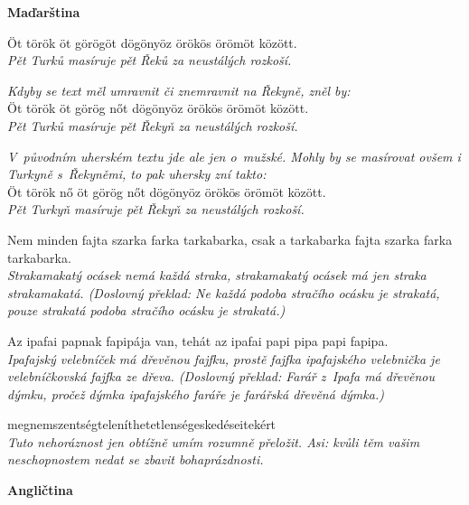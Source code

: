 \bigskip
\noindent
\textbf{Maďarština}

\medskip

\noindent
Öt török öt görögöt dögönyöz örökös örömöt között. \\
\textit{Pět Turků masíruje pět Řeků za neustálých rozkoší.}

\medskip

\noindent
\textit{Kdyby se text měl umravnit či znemravnit na Řekyně, zněl by: }\\
Öt török öt görög nőt dögönyöz örökös örömöt között. \\
\textit{Pět Turků masíruje pět Řekyň za neustálých rozkoší.}

\medskip

\noindent
\textit{V původním uherském textu jde ale jen o~mužské. Mohly by se masírovat ovšem i Turkyně s Řekyněmi, to pak uhersky zní takto:} \\
Öt török nő öt görög nőt dögönyöz örökös örömöt között.  \\
\textit{Pět Turkyň masíruje pět Řekyň za neustálých rozkoší.}

\medskip

\noindent
Nem minden fajta szarka farka tarkabarka, csak a tarkabarka fajta szarka farka tarkabarka. \\
\textit{Strakamakatý ocásek nemá každá straka, strakamakatý ocásek má jen straka strakamakatá. (Doslovný překlad: Ne každá podoba stračího ocásku je strakatá, pouze strakatá podoba stračího ocásku je strakatá.) }

\medskip

\noindent
Az ipafai papnak fapipája van, tehát az ipafai papi pipa papi fapipa. \\
\textit{Ipafajský velebníček má dřevěnou fajfku, prostě fajfka ipafajského velebnička je velebníčkovská fajfka ze dřeva. (Doslovný překlad: Farář z Ipafa má dřevěnou dýmku, pročež dýmka ipafajského faráře je farářská dřevěná dýmka.)}

\medskip

\noindent
megnemszentségteleníthetetlenségeskedéseitekért \\
\textit{Tuto nehoráznost jen obtížně umím rozumně přeložit. Asi: kvůli těm vašim neschopnostem nedat se zbavit bohaprázdnosti.}

\medskip




\bigskip

\noindent
\textbf{Angličtina}


